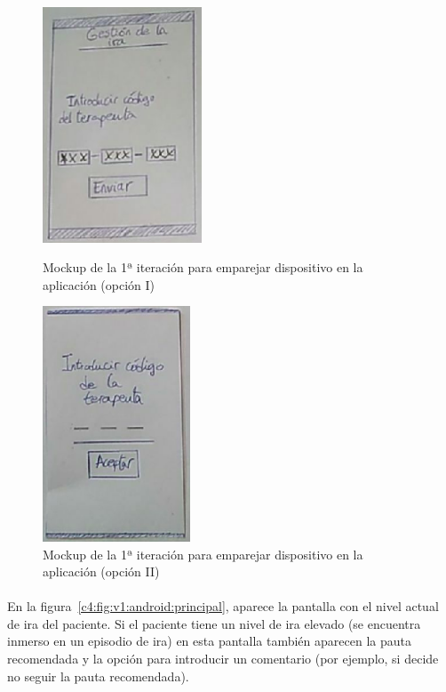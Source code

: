\begin{figure}[H]
    \centering
    \begin{minipage}{.45\textwidth}
        \centering
        \includegraphics[width=0.8\linewidth, height=7cm]{Imagenes/04DescProblema/mockups/v1/android/02-emparejar.png}
        \caption[Mockup de la 1ª iteración para emparejar dispositivo en la aplicación (opción I)]{Mockup de la 1ª iteración para emparejar dispositivo en la aplicación (opción I)}
        \label{c4:fig:v1:android:emparejar}
    \end{minipage}
    \hfill\vline\hfill
    \begin{minipage}{.45\textwidth}
        \centering
        \includegraphics[width=0.8\linewidth, height=7cm]{Imagenes/04DescProblema/mockups/v1/android/02-emparejar-2.png}
        \caption[Mockup de la 1ª iteración para emparejar dispositivo en la aplicación (opción II)]{Mockup de la 1ª iteración para emparejar dispositivo en la aplicación (opción II)}
        \label{c4:fig:v1:android:emparejar2}
    \end{minipage}
\end{figure}

\paragraph{}
En la figura~\ref{c4:fig:v1:android:principal}, aparece la pantalla con el nivel actual de ira del paciente. Si el paciente tiene un nivel de ira elevado (se encuentra inmerso en un episodio de ira) en esta pantalla también aparecen la pauta recomendada y la opción para introducir un comentario (por ejemplo, si decide no seguir la pauta recomendada).

